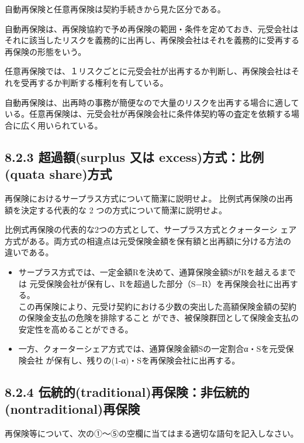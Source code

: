\documentclass[report,gutter=10mm,fore-edge=10mm,uplatex,dvipdfmx]{jlreq}
\begin{document}
\answer{}
自動再保険と任意再保険は契約手続きから見た区分である。

自動再保険は、再保険協約で予め再保険の範囲・条件を定めておき、元受会社はそれに該当したリスクを義務的に出再し、再保険会社はそれを義務的に受再する再保険の形態をいう。

任意再保険では、１リスクごとに元受会社が出再するか判断し、再保険会社はそれを受再するか判断する権利を有している。

自動再保険は、出再時の事務が簡便なので大量のリスクを出再する場合に適している。任意再保険は、元受会社が再保険会社に条件体契約等の査定を依頼する場合に広く用いられている。



\subsection{8.2.3 超過額(surplus 又は excess)方式：比例(quata share)方式}
再保険におけるサープラス方式について簡潔に説明せよ。
比例式再保険の出再額を決定する代表的な 2 つの方式について簡潔に説明せよ。

\answer{}
比例式再保険の代表的な2つの方式として、サープラス方式とクォーターシ
ェア方式がある。両方式の相違点は元受保険金額を保有額と出再額に分ける方法の
違いである。

\begin{itemize}
\item[] サープラス方式では、一定金額Rを決めて、通算保険金額SがRを越えるまでは
 元受保険会社が保有し、Rを超過した部分（S−R）を再保険会社に出再する。\\
この再保険により、元受け契約における少数の突出した高額保険金額の契約の保険金支払の危険を排除すること
ができ、被保険群団として保険金支払の安定性を高めることができる。
\item[] 一方、クォーターシェア方式では、通算保険金額Sの一定割合α・Sを元受保険会社
 が保有し、残りの(1-α)・Sを再保険会社に出再する。
\end{itemize}
\subsection{8.2.4 伝統的(traditional)再保険：非伝統的(nontraditional)再保険}
再保険等について、次の①～⑤の空欄に当てはまる適切な語句を記入しなさい。
\end{document}
